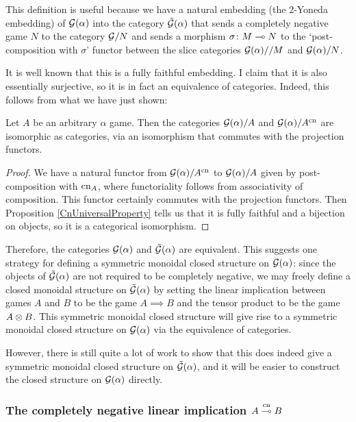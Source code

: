 \documentclass[11pt]{article} %
\begin{document}
This definition is useful because we have a natural embedding (the $2$-Yoneda embedding) of $\mathcal G(\alpha)$ into the category $\tilde{\mathcal G}(\alpha)$ that sends a completely negative game $N$ to the category $\mathcal G/N$ and sends a morphism $\sigma\colon M\multimap N$ to the `post-composition with $\sigma$' functor between the slice categories $\mathcal G(\alpha)//M$ and $\mathcal G(\alpha)/N$.  

It is well known that this is a fully faithful embedding.  I claim that it is also essentially surjective, so it is in fact an equivalence of categories.  Indeed, this follows from what we have just shown:

\begin{proposition}
  Let $A$ be an arbitrary $\alpha$ game.  Then the categories $\mathcal G(\alpha)/A$ and $\mathcal G(\alpha)/A^{\operatorname{cn}}$ are isomorphic as categories, via an isomorphism that commutes with the projection functors.

  \begin{proof}
    We have a natural functor from $\mathcal G(\alpha)/A^{\operatorname{cn}}$ to $\mathcal G(\alpha)/A$ given by post-composition with $\operatorname{cn}_A$, where functoriality follows from associativity of composition.  This functor certainly commutes with the projection functors.  Then Proposition \ref{CnUniversalProperty} tells us that it is fully faithful and a bijection on objects, so it is a categorical isomorphism.
  \end{proof}
\end{proposition}

Therefore, the categories $\mathcal G(\alpha)$ and $\tilde{\mathcal G}(\alpha)$ are equivalent.  This suggests one strategy for defining a symmetric monoidal closed structure on $\mathcal G(\alpha)$: since the objects of $\tilde{\mathcal G}(\alpha)$ are not required to be completely negative, we may freely define a closed monoidal structure on $\tilde{\mathcal G}(\alpha)$ by setting the linear implication between games $A$ and $B$ to be the game $A\implies B$ and the tensor product to be the game $A\otimes B$.  This symmetric monoidal closed structure will give rise to a symmetric monoidal closed structure on $\mathcal G(\alpha)$ via the equivalence of categories.  

However, there is still quite a lot of work to show that this does indeed give a symmetric monoidal closed structure on $\tilde{\mathcal G}(\alpha)$, and it will be easier to construct the closed structure on $\mathcal G(\alpha)$ directly.

\subsubsection{The completely negative linear implication $A\protect\overset{\operatorname{cn}}{\multimap} B$}
\label{ImpliesCnSex}
\end{document}

